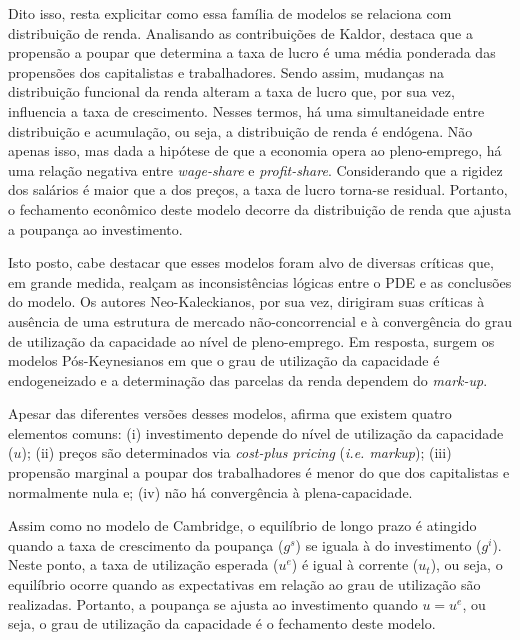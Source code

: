 Dito isso, resta explicitar como essa família de modelos se relaciona com distribuição de renda.
Analisando as contribuições de Kaldor, \textcite{hein_distribution_2014} destaca que a propensão a poupar que determina a taxa de lucro é uma média ponderada das propensões dos capitalistas e trabalhadores. Sendo assim, mudanças na distribuição funcional da renda alteram a taxa de lucro que, por sua vez, influencia a taxa de crescimento. Nesses termos, há uma simultaneidade entre distribuição e acumulação, ou seja, a distribuição de renda é endógena. Não apenas isso, mas dada a hipótese de que a economia opera ao pleno-emprego, há uma relação negativa entre \textit{wage-share} e \textit{profit-share}. Considerando que a rigidez dos salários é maior que a dos preços, a taxa de lucro torna-se residual. Portanto, o fechamento econômico deste modelo decorre da distribuição de renda que ajusta a poupança ao investimento. 


Isto posto, cabe destacar que esses modelos foram alvo de diversas críticas que, em grande medida, realçam as inconsistências lógicas entre o PDE e as conclusões do modelo. Os autores Neo-Kaleckianos, por sua vez, dirigiram suas críticas à ausência de uma estrutura de mercado não-concorrencial e à convergência do grau de utilização da capacidade ao nível de pleno-emprego. Em resposta, surgem os modelos Pós-Keynesianos em que o grau de utilização da capacidade é endogeneizado e a determinação das parcelas da renda dependem do \textit{mark-up}.

Apesar das diferentes versões desses modelos, \textcite[p.~360]{lavoie_post-keynesian_2014} afirma que existem quatro elementos comuns: (i) investimento depende do nível de utilização da capacidade ($u$); (ii) preços são determinados via \textit{cost-plus pricing} (\textit{i.e. markup}); (iii) propensão marginal a poupar dos trabalhadores é menor do que dos capitalistas e normalmente nula e; (iv) não há convergência à plena-capacidade.


Assim como no modelo de Cambridge, o equilíbrio de longo prazo é atingido quando a taxa de crescimento da poupança ($g^s$) se iguala à do investimento ($g^i$). Neste ponto, a taxa de utilização esperada ($u^e$) é igual à corrente ($u_t$), ou seja, o equilíbrio ocorre quando as expectativas em relação ao grau de utilização são realizadas. Portanto, a poupança se ajusta ao investimento quando $u = u^e$, ou seja, o grau de utilização da capacidade é o fechamento deste modelo.

